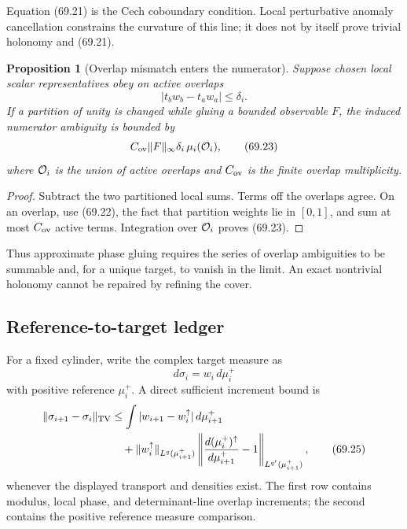 \documentclass[11pt]{article}
\newtheorem{proposition}[theorem]{Proposition}
\begin{document}
Equation (69.21) is the Cech coboundary condition.  Local perturbative
anomaly cancellation constrains the curvature of this line; it does
not by itself prove trivial holonomy and (69.21).

\begin{proposition}[Overlap mismatch enters the numerator]
\label{prop:v11v69-overlap}
Suppose chosen local scalar representatives obey on active overlaps
\[
                              |t_bw_b-t_aw_a|\le\delta_i.      \tag{69.22}
\]
If a partition of unity is changed while gluing a bounded observable
\(F\), the induced numerator ambiguity is bounded by
\[
                         C_{\rm ov}\lVert F\rVert_\infty
                         \delta_i\,\mu_i({\cal O}_i),          \tag{69.23}
\]
where \({\cal O}_i\) is the union of active overlaps and
\(C_{\rm ov}\) is the finite overlap multiplicity.
\end{proposition}

\begin{proof}
Subtract the two partitioned local sums.  Terms off the overlaps agree.
On an overlap, use (69.22), the fact that partition weights lie in
\([0,1]\), and sum at most \(C_{\rm ov}\) active terms.  Integration
over \({\cal O}_i\) proves (69.23).
\end{proof}

Thus approximate phase gluing requires the series of overlap
ambiguities to be summable and, for a unique target, to vanish in the
limit.  An exact nontrivial holonomy cannot be repaired by refining the
cover.

\subsection{Reference-to-target ledger}

For a fixed cylinder, write the complex target measure as
\[
                              d\sigma_i=w_i\,d\mu_i^+          \tag{69.24}
\]
with positive reference \(\mu_i^+\).  A direct sufficient increment
bound is
\[
\begin{split}
 \lVert\sigma_{i+1}-\sigma_i\rVert_{\rm TV}
 &\le
 \int|w_{i+1}-w_i^{\uparrow}|\,d\mu_{i+1}^+\\
 &\quad+
 \lVert w_i^{\uparrow}\rVert_{L^q(\mu_{i+1}^+)}
 \left\|\frac{d(\mu_i^+)^\uparrow}
              {d\mu_{i+1}^+}-1\right\|_{L^{q'}(\mu_{i+1}^+)},
                                                                  \tag{69.25}
\end{split}
\]
whenever the displayed transport and densities exist.  The first row
contains modulus, local phase, and determinant-line overlap increments;
the second contains the positive reference measure comparison.
\end{document}
